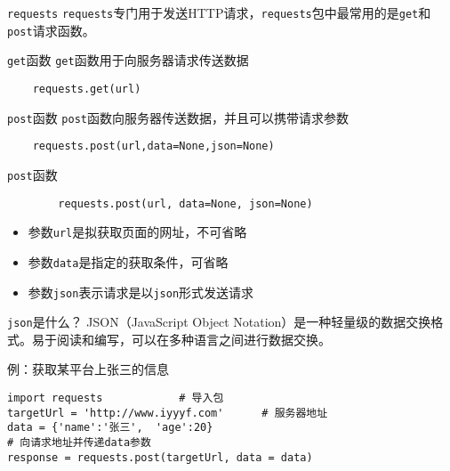 \documentclass[t]{beamer}
\begin{document}
\begin{frame}[fragile]{\texttt{requests}}
    \texttt{requests}专门用于发送HTTP请求，\texttt{requests}包中最常用的是\texttt{get}和\texttt{post}请求函数。

\begin{block}{\texttt{get}函数}
    \texttt{get}函数用于向服务器请求传送数据
\begin{lstlisting}
    requests.get(url)
\end{lstlisting}
\end{block}

\begin{block}{\texttt{post}函数}
    \texttt{post}函数向服务器传送数据，并且可以携带请求参数
\begin{lstlisting}
    requests.post(url,data=None,json=None)
\end{lstlisting}
\end{block}
\end{frame}

\begin{frame}[fragile]{\texttt{post}函数}
    \begin{lstlisting}
        requests.post(url, data=None, json=None)
    \end{lstlisting}
\begin{itemize}
    \item 参数\verb|url|是拟获取页面的网址，{\color{red}不可省略}
    \item 参数\verb|data|是指定的获取条件，可省略
    \item 参数\verb|json|表示请求是以\verb|json|形式发送请求
\end{itemize}

\begin{block}{\texttt{json}是什么？}
    JSON（JavaScript Object Notation）是一种轻量级的数据交换格式。易于阅读和编写，可以在多种语言之间进行数据交换。
\end{block}
\end{frame}

\begin{frame}[fragile]{例：获取某平台上张三的信息}
\begin{lstlisting}
import requests            # 导入包
targetUrl = 'http://www.iyyyf.com'      # 服务器地址
data = {'name':'张三',  'age':20}
# 向请求地址并传递data参数
response = requests.post(targetUrl, data = data) 
\end{lstlisting}
\end{frame}
\end{document}
